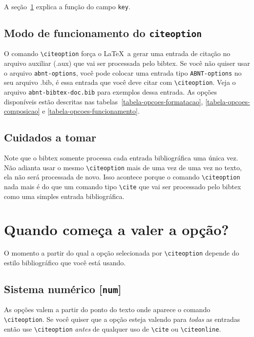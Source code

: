 \documentclass[espacosimples]{abnt}
\begin{document}
A seção~\ref{section-quando-vale} explica a função do campo {\tt key}.

\subsection{Modo de funcionamento do {\tt citeoption}}

O comando \verb+\citeoption+ força o \LaTeX\ a gerar
uma entrada de citação no arquivo auxiliar (.aux) que vai ser processada
pelo bibtex. Se você não quiser usar o arquivo {\tt abnt-options}, você
pode colocar uma entrada tipo {\tt ABNT-options}
no seu arquivo .bib, é essa entrada que você deve citar com \verb+\citeoption+.
Veja o arquivo
{\tt abnt-bibtex-doc.bib} para exemplos dessa entrada.
As opções disponíveis estão descritas nas
tabelas~\ref{tabela-opcoes-formatacao}, \ref{tabela-opcoes-composicao} e
\ref{tabela-opcoes-funcionamento}.

\subsection{Cuidados a tomar}

Note que o bibtex
somente processa cada entrada bibliográfica uma única vez. Não adianta usar
o mesmo \verb+\citeoption+ mais de uma vez de uma vez no texto, ela não
será processada de novo. Isso acontece porque o comando \verb+\citeoption+
nada mais é do que um comando tipo \verb+\cite+ que vai ser processado
pelo bibtex como uma simples entrada bibliográfica.

\section{Quando começa a valer a opção?}
\label{section-quando-vale}

O momento a partir do qual a opção selecionada por \verb+\citeoption+
depende do estilo bibliográfico que você está usando.

\subsection{Sistema numérico [{\tt num}]}
As opções valem a partir
do ponto do texto onde aparece o comando \verb+\citeoption+.
Se você quiser que a opção esteja valendo para \emph{todas}
as entradas então use \verb+\citeoption+ \emph{antes} de
qualquer uso de \verb+\cite+ ou \verb+\citeonline+.
\end{document}
